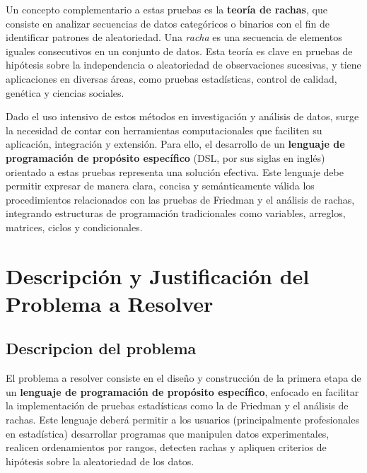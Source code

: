 \documentclass{article}
\begin{document}
Un concepto complementario a estas pruebas es la \textbf{teoría de rachas}, que consiste en analizar secuencias de datos categóricos o binarios con el fin de identificar patrones de aleatoriedad. Una \emph{racha} es una secuencia de elementos iguales consecutivos en un conjunto de datos. Esta teoría es clave en pruebas de hipótesis sobre la independencia o aleatoriedad de observaciones sucesivas, y tiene aplicaciones en diversas áreas, como pruebas estadísticas, control de calidad, genética y ciencias sociales.

Dado el uso intensivo de estos métodos en investigación y análisis de datos, surge la necesidad de contar con herramientas computacionales que faciliten su aplicación, integración y extensión. Para ello, el desarrollo de un \textbf{lenguaje de programación de propósito específico} (DSL, por sus siglas en inglés) orientado a estas pruebas representa una solución efectiva. Este lenguaje debe permitir expresar de manera clara, concisa y semánticamente válida los procedimientos relacionados con las pruebas de Friedman y el análisis de rachas, integrando estructuras de programación tradicionales como variables, arreglos, matrices, ciclos y condicionales.



\section{Descripción y Justificación del Problema a Resolver}\label{sec:descr}

\subsection{Descripcion del problema}

El problema a resolver consiste en el diseño y construcción de la primera etapa de un \textbf{lenguaje de programación de propósito específico}, enfocado en facilitar la implementación de pruebas estadísticas como la de Friedman y el análisis de rachas. Este lenguaje deberá permitir a los usuarios (principalmente profesionales en estadística) desarrollar programas que manipulen datos experimentales, realicen ordenamientos por rangos, detecten rachas y apliquen criterios de hipótesis sobre la aleatoriedad de los datos.
\end{document}
